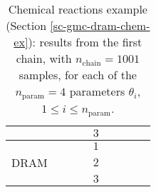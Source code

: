 \begin{table}[h!]
\begin{center}
\begin{tabular}{|c|c|c|c|c|c|c|c|c|}
\cline{5-9}
       &          &                        &                        & $3$ &                          &                                &                        &                               \\
\hline
\hline
       &          &                        &                        & $1$ &                          &                                &                        &                               \\
\cline{5-9}
DRAM   &          &                        &                        & $2$ &                          &                                &                        &                               \\
\cline{5-9}
       &          &                        &                        & $3$ &                          &                                &                        &                               \\
\hline
\end{tabular}
\caption{Chemical reactions example (Section \ref{sc-gmc-dram-chem-ex}):
results from the first chain, with $n_{\text{chain}}=1001$ samples,
for each of the $n_{\text{param}}=4$ parameters $\theta_i$, $1\leqslant i\leqslant n_{\text{param}}$.
}
\label{tab-dram-chem-ex-results-1}
\end{center}
\end{table}

